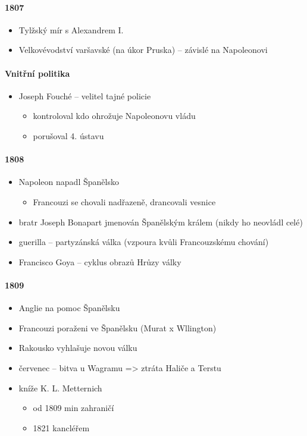 \paragraph{1807}
\begin{itemize}
\item Tylžský mír s Alexandrem I.
\item Velkovévodství varšavské (na úkor Pruska) -- závislé na Napoleonovi
\end{itemize}

\paragraph{Vnitřní politika}
\begin{itemize}
\item Joseph Fouché -- velitel tajné policie
	\begin{itemize}
	\item kontroloval kdo ohrožuje Napoleonovu vládu
	\item porušoval 4. ústavu
	\end{itemize}
\end{itemize}

\paragraph{1808}
\begin{itemize}
\item Napoleon napadl Španělsko
	\begin{itemize}
	\item Francouzi se chovali nadřazeně, drancovali vesnice
	\end{itemize}
\item bratr Joseph Bonapart jmenován Španělským králem (nikdy ho neovládl celé)
\item guerilla -- partyzánská válka (vzpoura kvůli Francouzskému chování)
\item Francisco Goya -- cyklus obrazů Hrůzy války
\end{itemize}

\paragraph{1809}
\begin{itemize}
\item Anglie na pomoc Španělsku
\item Francouzi poraženi ve Španělsku (Murat x Wllington)
\item Rakousko vyhlašuje novou válku
\item červenec -- bitva u Wagramu => ztráta Haliče a Terstu
\item kníže K. L. Metternich 
	\begin{itemize}
	\item od 1809 min zahraničí
	\item 1821 kancléřem
	\end{itemize}
\end{itemize}

